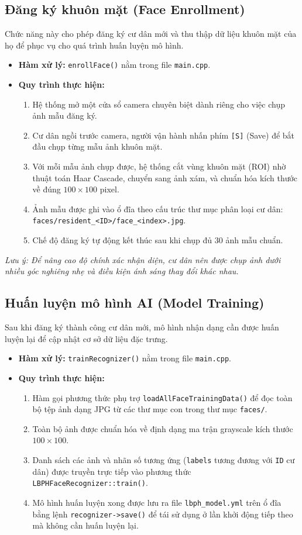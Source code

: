 \documentclass[12pt,a4paper]{article}
\begin{document}
\subsection{Đăng ký khuôn mặt (Face Enrollment)}
Chức năng này cho phép đăng ký cư dân mới và thu thập dữ liệu khuôn mặt của họ để phục vụ cho quá trình huấn luyện mô hình.
\begin{itemize}
    \item \textbf{Hàm xử lý:} \texttt{enrollFace()} nằm trong file \texttt{main.cpp}.
    \item \textbf{Quy trình thực hiện:}
    \begin{enumerate}
        \item Hệ thống mở một cửa sổ camera chuyên biệt dành riêng cho việc chụp ảnh mẫu đăng ký.
        \item Cư dân ngồi trước camera, người vận hành nhấn phím \texttt{[S]} (Save) để bắt đầu chụp từng mẫu ảnh khuôn mặt.
        \item Với mỗi mẫu ảnh chụp được, hệ thống cắt vùng khuôn mặt (ROI) nhờ thuật toán Haar Cascade, chuyển sang ảnh xám, và chuẩn hóa kích thước về đúng $100 \times 100$ pixel.
        \item Ảnh mẫu được ghi vào ổ đĩa theo cấu trúc thư mục phân loại cư dân: \texttt{faces/resident\_<ID>/face\_<index>.jpg}.
        \item Chế độ đăng ký tự động kết thúc sau khi chụp đủ $30$ ảnh mẫu chuẩn.
    \end{enumerate}
\end{itemize}
\textit{Lưu ý: Để nâng cao độ chính xác nhận diện, cư dân nên được chụp ảnh dưới nhiều góc nghiêng nhẹ và điều kiện ánh sáng thay đổi khác nhau.}

\subsection{Huấn luyện mô hình AI (Model Training)}
Sau khi đăng ký thành công cư dân mới, mô hình nhận dạng cần được huấn luyện lại để cập nhật cơ sở dữ liệu đặc trưng.
\begin{itemize}
    \item \textbf{Hàm xử lý:} \texttt{trainRecognizer()} nằm trong file \texttt{main.cpp}.
    \item \textbf{Quy trình thực hiện:}
    \begin{enumerate}
        \item Hàm gọi phương thức phụ trợ \texttt{loadAllFaceTrainingData()} để đọc toàn bộ tệp ảnh dạng JPG từ các thư mục con trong thư mục \texttt{faces/}.
        \item Toàn bộ ảnh được chuẩn hóa về định dạng ma trận grayscale kích thước $100 \times 100$.
        \item Danh sách các ảnh và nhãn số tương ứng (\texttt{labels} tương đương với \texttt{ID} cư dân) được truyền trực tiếp vào phương thức \texttt{LBPHFaceRecognizer::train()}.
        \item Mô hình huấn luyện xong được lưu ra file \texttt{lbph\_model.yml} trên ổ đĩa bằng lệnh \texttt{recognizer->save()} để tái sử dụng ở lần khởi động tiếp theo mà không cần huấn luyện lại.
    \end{enumerate}
\end{itemize}
\end{document}
